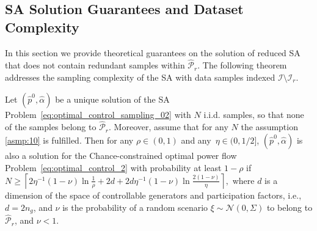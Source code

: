 \subsection{SA Solution Guarantees and Dataset Complexity}
In this section we provide theoretical guarantees on the solution of reduced SA that does not contain redundant samples within $\hat{\mathcal{P}}_r$.
The following theorem addresses the sampling complexity of the SA with data samples indexed $\mathcal{I} \setminus \mathcal{I}_r$.
\begin{theorem}\label{thm:40}
Let $(\hat{p}^0, \hat{\alpha})$ be a unique solution of the SA Problem~\eqref{eq:optimal_control_sampling_02} with $N$ i.i.d. samples, so that none of the samples belong to $\hat{\mathcal{P}}_{r}$. Moreover, assume that for any $N$ the assumption \ref{asmp:10} is fulfilled. Then for any $\rho \in (0,1)$ and any~$\eta \in (0, 1/2]$, $(\hat{p}^0, \hat{\alpha})$ is also a solution for the Chance-constrained optimal power flow Problem~\eqref{eq:optimal_control_2} with probability at least $1-\rho$ if 
$%
  N \ge \left\lceil 2\eta^{-1}(1-\nu)\ln \frac{1}{\rho} + 2d + 2d\eta^{-1}(1-\nu) \ln\frac{2(1-\nu)}{\eta} \right\rceil, 
$%
 where $d$ is a dimension of the space of controllable generators and participation factors, i.e., $d = 2 n_g$, and $\nu$ is the probability of a random scenario $\xi \sim \mathcal{N}(0, \Sigma)$ to belong to $\hat{\mathcal{P}}_{r}$, and $\nu < 1$. 
\end{theorem}

